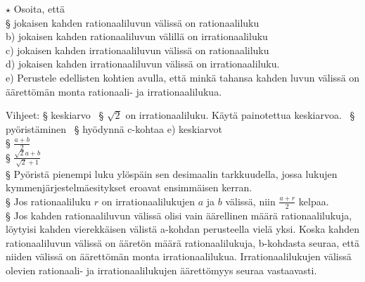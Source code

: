 \begin{tehtavasivu}
\begin{tehtava}
$\star$ Osoita, että \\
§ jokaisen kahden rationaaliluvun välissä on rationaaliluku \\
b) jokaisen kahden rationaaliluvun välillä on irrationaaliluku \\
c) jokaisen kahden irrationaaliluvun välissä on rationaaliluku \\
d) jokaisen kahden irrationaaliluvun välissä on irrationaaliluku. \\
e) Perustele edellisten kohtien avulla, että minkä tahansa kahden luvun
välissä on äärettömän monta rationaali- ja irrationaalilukua.
\begin{vastaus}
Vihjeet:
§ keskiarvo \
§ $\sqrt{2}$ on irrationaaliluku. Käytä
painotettua keskiarvoa. \
§ pyöristäminen \
§ hyödynnä c-kohtaa
e) keskiarvot %
\\
§ $\frac{a+b}{2}$ \\
§ $\frac{\sqrt{2}a+b}{\sqrt{2}+1}$ \\
§ Pyöristä pienempi luku ylöspäin sen desimaalin tarkkuudella, jossa lukujen kymmenjärjestelmäesitykset eroavat ensimmäisen kerran. \\
§ Jos rationaaliluku $r$ on irrationaalilukujen $a$ ja $b$ välissä, niin $\frac{a+r}{2}$ kelpaa. \\
§ Jos kahden rationaaliluvun välissä olisi vain äärellinen määrä rationaalilukuja, löytyisi kahden vierekkäisen välistä a-kohdan perusteella vielä yksi. Koska kahden rationaaliluvun välissä on ääretön määrä rationaalilukuja, b-kohdasta seuraa, että niiden välissä on äärettömän monta irrationaalilukua. Irrationaalilukujen välissä olevien rationaali- ja irrationaalilukujen äärettömyys seuraa vastaavasti.
\end{vastaus}
\end{tehtava}

\end{tehtavasivu}
